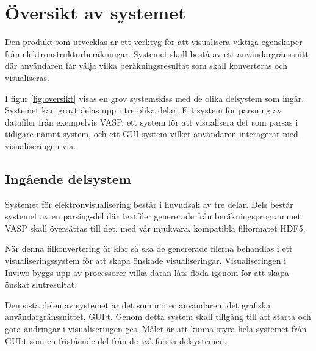 \newpage
\section{Översikt av systemet}

Den produkt som utvecklas är ett verktyg för att visualisera viktiga egenskaper från elektronstrukturberäkningar. Systemet skall bestå av ett användargränssnitt där användaren får välja vilka beräkningsresultat som skall konverteras och visualiseras.

I figur \ref{fig:oversikt} visas en grov systemskiss med de olika delsystem som ingår. Systemet kan grovt delas upp i tre olika delar. Ett system för parsning av datafiler från exempelvis VASP, ett system för att visualisera det som parsas i tidigare nämnt system, och ett GUI-system vilket användaren interagerar med visualiseringen via.

\subsection{Ingående delsystem}
Systemet för elektronvisualisering består i huvudsak av tre delar. Dels består systemet av en parsing-del där textfiler genererade från beräkningsprogrammet VASP skall översättas till det, med vår mjukvara, kompatibla filformatet HDF5. 

När denna filkonvertering är klar så ska de genererade filerna behandlas i ett visualiseringssystem för att skapa önskade visualiseringar. Visualiseringen i Inviwo byggs upp av processorer vilka datan låts flöda igenom för att skapa önskat slutresultat.

Den sista delen av systemet är det som möter användaren, det grafiska användargränssnittet, GUI:t.
Genom detta system skall tillgång till att starta och göra ändringar i visualiseringen ges. Målet är att kunna styra hela systemet från GUI:t som en fristående del från de två första delsystemen.